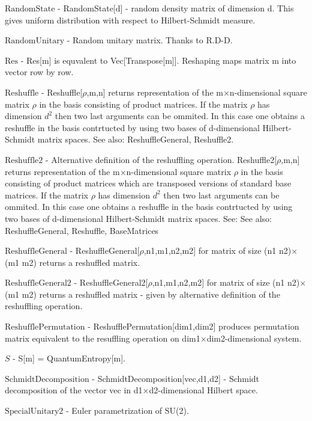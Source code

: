 \documentclass[a4paper,12pt]{article}
\begin{document}
\textbf{$ \text{RandomState} $ } - RandomState[d] - random density matrix of dimension d. This gives uniform distribution with respect to Hilbert-Schmidt measure.$  $

\textbf{$ \text{RandomUnitary} $ } - Random unitary matrix. Thanks to R.D-D.$  $

\textbf{$ \text{Res} $ } - Res[m] is equvalent to Vec[Transpose[m]]. Reshaping maps matrix m into vector row by row.$  $

\textbf{$ \text{Reshuffle} $ } - Reshuffle[$\rho $,m,n] returns representation of the m$\times $n-dimensional square matrix $\rho $ in the basis consisting of product matrices. If  the matrix $\rho $ has dimension $ d^2 $ then two last arguments can be ommited. In this case one obtains a reshuffle in the basis contrtucted by using two bases of d-dimensional Hilbert-Schmidt matrix spaces. See also: ReshuffleGeneral, Reshuffle2.$  $

\textbf{$ \text{Reshuffle2} $ } - Alternative definition of the reshuffling operation. Reshuffle2[$\rho $,m,n] returns representation of the m$\times $n-dimensional square matrix $\rho $ in the basis consisting of product matrices which are transposed versions of standard base matrices. If the matrix $\rho $ has dimension $ d^2 $ then two last arguments can be ommited. In this case one obtains a reshuffle in the basis contrtucted by using two bases of d-dimensional Hilbert-Schmidt matrix spaces. See: See also: ReshuffleGeneral, Reshuffle, BaseMatrices$  $

\textbf{$ \text{ReshuffleGeneral} $ } - ReshuffleGeneral[$\rho $,n1,m1,n2,m2] for matrix of size (n1 n2)$\times $(m1 m2) returns a reshuffled matrix.$  $

\textbf{$ \text{ReshuffleGeneral2} $ } - ReshuffleGeneral2[$\rho $,n1,m1,n2,m2] for matrix of size (n1 n2)$\times $(m1 m2) returns a reshuffled matrix - given by alternative definition of the reshuffling operation.$  $

\textbf{$ \text{ReshufflePermutation} $ } - ReshufflePermutation[dim1,dim2] produces permutation matrix equivalent to the resuffling operation on dim1$\times $dim2-dimensional system.$  $

\textbf{$ S $ } - S[m] = QuantumEntropy[m].$  $

\textbf{$ \text{SchmidtDecomposition} $ } - SchmidtDecomposition[vec,d1,d2] - Schmidt decomposition of the vector vec in d1$\times $d2-dimensional Hilbert space.$  $

\textbf{$ \text{SpecialUnitary2} $ } - Euler parametrization of SU(2).$  $
\end{document}
